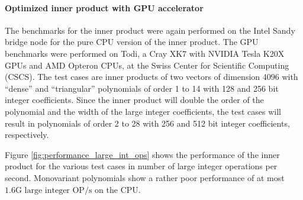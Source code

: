 \documentclass[oribibl,a4paper]{llncs2e/llncs}
\begin{document}

\paragraph{Optimized inner product with GPU accelerator}
The benchmarks for the inner product were again performed on the Intel Sandy bridge node for the pure CPU version of the inner product.
The GPU benchmarks were performed on Todi, a Cray XK7 with NVIDIA Tesla K20X GPUs and AMD Opteron CPUs, at the Swiss Center for Scientific Computing (CSCS).
The test cases are inner products of two vectors of dimension 4096 with ``dense'' and ``triangular'' polynomials of order 1 to 14 with 128 and 256 bit integer coefficients.
Since the inner product will double the order of the polynomial and the width of the large integer coefficients, the test cases will result in polynomials of order 2 to 28 with 256 and 512 bit integer coefficients, respectively.

Figure \ref{fig:performance_large_int_ops} shows the performance of the inner product for the various test cases in number of large integer operations per second.
Monovariant polynomials show a rather poor performance of at most $1.6 \text{G large integer OP/s}$ on the CPU.
\end{document}

